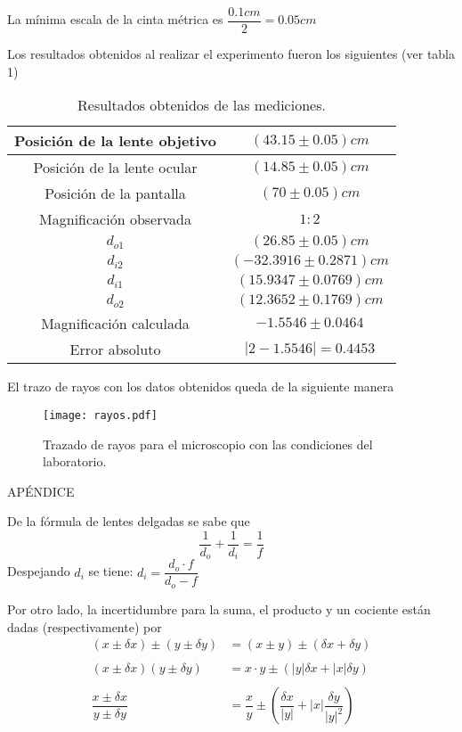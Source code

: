 \documentclass[a4paper, 10pt]{article}
\begin{document}
	
	La mínima escala de la cinta métrica es $\dfrac{0.1 cm}{2}=0.05 cm$
	
	Los resultados obtenidos al realizar el experimento fueron los siguientes (ver tabla 1)
	
	\begin{table}[ht]
		\centering
		\caption{Resultados obtenidos de las mediciones.}
		\begin{tabular}{|c|c|}
			\hline
			Posición de la lente objetivo & $ (43.15\pm0.05)cm $ \\
			\hline
			Posición de la lente ocular & $ (14.85\pm0.05)cm $  \\
			\hline
			Posición de la pantalla & $ (70\pm0.05) cm $  \\
			\hline
			Magnificación observada & $ 1:2 $ \\
			\hline
			$d_{o1}$ & $ (26.85\pm 0.05) cm $  \\
			\hline
			$d_{i2}$ & $ (-32.3916\pm 0.2871) cm $ \\
			\hline
			$d_{i1} $ & $ (15.9347\pm0.0769)cm $  \\
			\hline
			$d_{o2}$ & $ (12.3652\pm0.1769)cm $  \\
			\hline
			Magnificación calculada & $ -1.5546\pm0.0464 $  \\
			\hline
			Error absoluto &  $ |2-1.5546|=0.4453 $\\
			\hline
		\end{tabular}
	\end{table}
	
	El trazo de rayos con los datos obtenidos queda de la siguiente manera
	
	\begin{figure}[ht]
		\centering
		\texttt{[image: rayos.pdf]}
		\caption{Trazado de rayos para el microscopio con las condiciones del laboratorio.}
	\end{figure}
	
	
	
	
	\newpage
	APÉNDICE
	
	De la fórmula de lentes delgadas se sabe que 
	$$\dfrac{1}{d_o}+\dfrac{1}{d_i}=\dfrac{1}{f}$$
	Despejando $ d_i $ se tiene: \hspace{0.4cm} $d_i=\dfrac{d_o\cdot f}{d_o-f}$
	
	Por otro lado, la incertidumbre para la suma, el producto y un cociente están dadas (respectivamente) por
	\begin{align*}
		(x\pm \delta x)\pm(y\pm \delta y)&=(x\pm y)\pm(\delta x+\delta y)\\\\
		(x\pm\delta x)(y\pm\delta y)&=x\cdot y\pm\left(|y|\delta x+|x|\delta y \right)\\\\
		\dfrac{x\pm\delta x}{y\pm\delta y}&=\dfrac{x}{y}\pm\left(\dfrac{\delta x}{|y|}+|x|\dfrac{\delta y}{|y|^2}\right)
	\end{align*}
	
\end{document}
